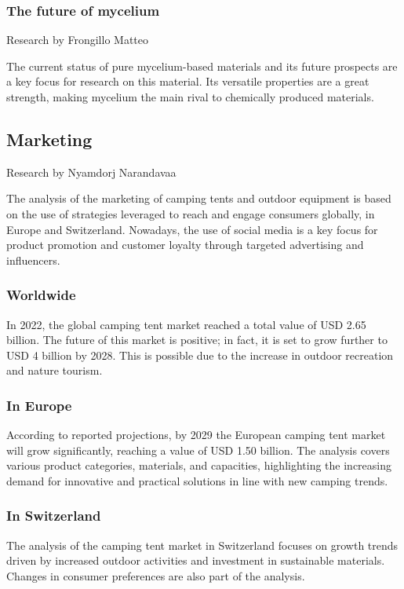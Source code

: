 \documentclass{article}
\begin{document}
\subsubsection{The future of mycelium}
{\small Research by Frongillo Matteo}

The current status of pure mycelium-based materials and its future prospects are a key
focus for research on this material. Its versatile properties are a great strength, making
mycelium the main rival to chemically produced materials.\\


\subsection{Marketing}
{\small Research by Nyamdorj Narandavaa}

The analysis of the marketing of camping tents and outdoor equipment is based on the use
of strategies leveraged to reach and engage consumers globally, in Europe and Switzerland.
Nowadays, the use of social media is a key focus for product promotion and customer
loyalty through targeted advertising and influencers.

\subsubsection{Worldwide}
In 2022, the global camping tent market reached a total value of USD 2.65 billion. The
future of this market is positive; in fact, it is set to grow further to USD 4 billion by
2028. This is possible due to the increase in outdoor recreation and nature tourism.\\


\subsubsection{In Europe}
According to reported projections, by 2029 the European camping tent market will grow
significantly, reaching a value of USD 1.50 billion. The analysis covers various product
categories, materials, and capacities, highlighting the increasing demand for innovative
and practical solutions in line with new camping trends.\\


\subsubsection{In Switzerland}
The analysis of the camping tent market in Switzerland focuses on growth trends driven by
increased outdoor activities and investment in sustainable materials.
Changes in consumer preferences are also part of the analysis.\\
\end{document}
